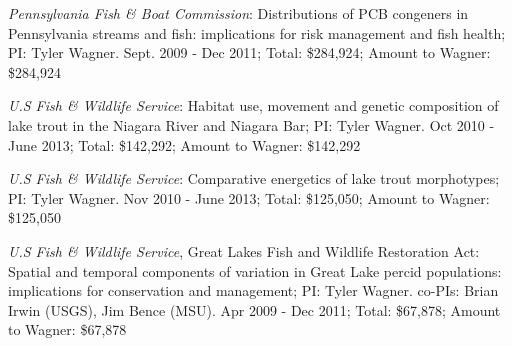\documentclass[10pt]{article}
\begin{document}
\begin{flushleft}
\begin{etaremune}
\item  {\sl  Pennsylvania Fish \& Boat Commission}: Distributions of PCB congeners in Pennsylvania streams and fish: implications for risk management and fish health; PI: Tyler Wagner. Sept. 2009 - Dec 2011; Total: \$284,924; Amount to Wagner: \$284,924

\item {\sl U.S Fish \& Wildlife Service}: Habitat use, movement and genetic composition of lake trout in the Niagara River and Niagara Bar; PI: Tyler Wagner. Oct 2010 - June 2013; Total: \$142,292;  Amount to Wagner: \$142,292

\item  {\sl U.S Fish \& Wildlife Service}: Comparative energetics of lake trout morphotypes; PI: Tyler Wagner. Nov 2010 - June 2013; Total: \$125,050; Amount to Wagner:  \$125,050

\item  {\sl U.S Fish \& Wildlife Service}, Great Lakes Fish and Wildlife Restoration Act: Spatial and temporal components of variation in Great Lake percid populations: implications for conservation and management; PI: Tyler Wagner. co-PIs: Brian Irwin (USGS), Jim Bence (MSU). Apr 2009 - Dec 2011; Total: \$67,878; Amount to Wagner: \$67,878
\end{etaremune}



\end{flushleft}
\end{document}
